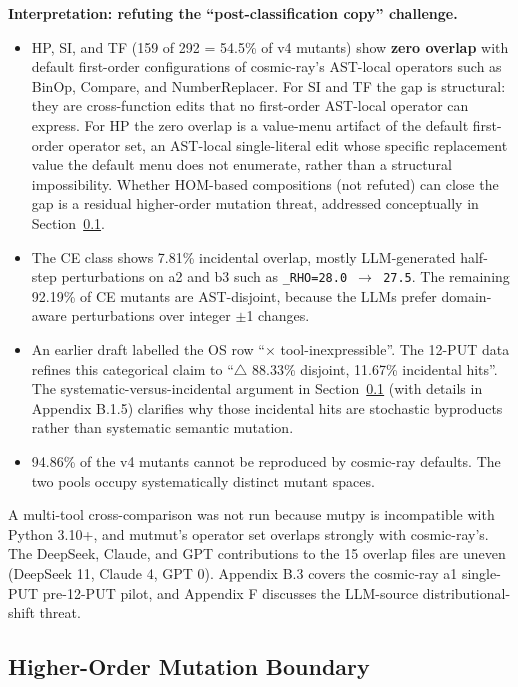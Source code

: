 \documentclass[manuscript,screen,review]{acmart}
\begin{document}
\textbf{Interpretation: refuting the ``post-classification copy''
challenge.}

\begin{itemize}

\item
  HP, SI, and TF (159 of 292 = 54.5\% of v4 mutants) show \textbf{zero
  overlap} with default first-order configurations of cosmic-ray's
  AST-local operators such as BinOp, Compare, and NumberReplacer. For SI
  and TF the gap is structural: they are cross-function edits that no
  first-order AST-local operator can express. For HP the zero overlap is
  a value-menu artifact of the default first-order operator set, an
  AST-local single-literal edit whose specific replacement value the
  default menu does not enumerate, rather than a structural
  impossibility. Whether HOM-based compositions \citep{jia2008subtle}
  (not refuted) can close the gap is a residual higher-order mutation
  threat, addressed conceptually in Section~\ref{preventive-defence-framing}.
\item
  The CE class shows 7.81\% incidental overlap, mostly LLM-generated
  half-step perturbations on a2 and b3 such as
  \texttt{\_RHO=28.0\ $\to$\ 27.5}. The remaining 92.19\% of CE mutants are
  AST-disjoint, because the LLMs prefer domain-aware perturbations over
  integer $\pm$1 changes.
\item
  An earlier draft labelled the OS row ``$\times$ tool-inexpressible''. The
  12-PUT data refines this categorical claim to ``$\bigtriangleup$ 88.33\% disjoint,
  11.67\% incidental hits''. The systematic-versus-incidental argument
  in Section~\ref{preventive-defence-framing} (with details in Appendix B.1.5) clarifies why those
  incidental hits are stochastic byproducts rather than systematic
  semantic mutation.
\item
  94.86\% of the v4 mutants cannot be reproduced by cosmic-ray defaults.
  The two pools occupy systematically distinct mutant spaces.
\end{itemize}

A multi-tool cross-comparison was not run because mutpy is incompatible
with Python 3.10+, and mutmut's operator set overlaps strongly with
cosmic-ray's. The DeepSeek, Claude, and GPT contributions to the 15
overlap files are uneven (DeepSeek 11, Claude 4, GPT 0). Appendix B.3
covers the cosmic-ray a1 single-PUT pre-12-PUT pilot, and Appendix F
discusses the LLM-source distributional-shift threat.

\subsection{Higher-Order Mutation Boundary}\label{preventive-defence-framing}
\end{document}
